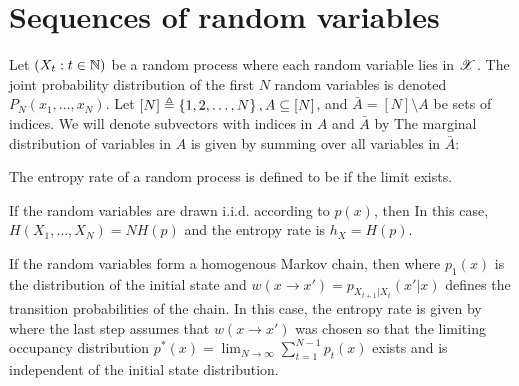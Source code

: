 \documentclass[letterpaper,10pt,english]{article}
\begin{document}
\section{Sequences of random variables}
Let $(X_t: t \in \mathbb{N})$ be a random process where each random variable lies in $\mathscr{X}$. 
The joint probability distribution of the first $N$ random variables is denoted 
$P_N (x_1, \dots , x_N)$. 
Let $[N] \triangleq \left\{1,2, \dots,N\right\}, A \subseteq [N]$, and $\bar{A} = [N]\setminus A$ be sets of indices. 
We will denote subvectors with indices in $A$ and $\bar{A}$ by
The marginal distribution of variables in $A$ is given by summing over all variables in $\bar{A}$: 
\begin{defn}
The entropy rate of a random process is defined to be
if the limit exists.
\end{defn} 
\begin{shaded*}\begin{exmp}
If the random variables are drawn i.i.d. according to $p(x)$, then 
In this case, $H (X_1, \dots,X_N) = NH (p)$ and the entropy rate is $h_X = H (p)$.
\end{exmp}\end{shaded*} 
\begin{shaded*}\begin{exmp}
If the random variables form a homogenous Markov chain, then 
where $p_1(x)$ is the distribution of the initial state and $w(x \to x') = p_{X_{t+1}|X_t} (x'|x)$ defines the transition probabilities of the chain. 
In this case, the entropy rate is given by
where the last step assumes that $w(x \to x')$ was chosen so that the limiting occupancy
distribution $p^{\ast}(x) = \lim_{N \to \infty} \sum_{t=1}^{N-1}p_t(x)$ exists and is independent of the initial state distribution. 
\end{exmp}\end{shaded*}
\end{document}
